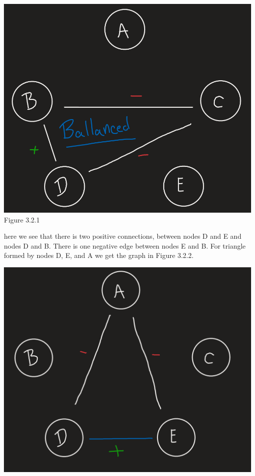 \documentclass[11pt]{article}
\begin{document}
\begin{enumerate}
{\begin{center}
	\includegraphics[scale=0.5]{Figure_3_2_1}\\
	Figure 3.2.1\\
\end{center}
here we see that there is two positive connections, between nodes D and E and nodes D and B.  There is one negative edge between nodes E and B. For triangle formed by nodes D, E, and A we get the graph in Figure 3.2.2.
\begin{center}
	\includegraphics[scale=0.5]{Figure_3_2_2}\\

\end{center}}
\end{enumerate}
\end{document}
